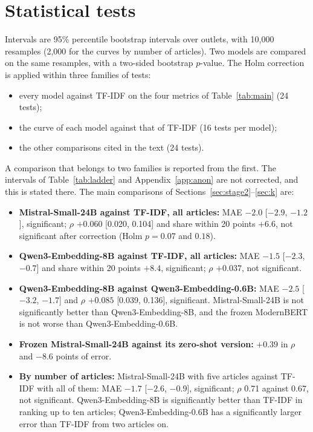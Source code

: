 \documentclass[11pt,a4paper]{article}
\begin{document}
\section{Statistical tests}\label{app:stats}
Intervals are 95\% percentile bootstrap intervals over outlets, with 10,000 resamples (2,000 for the curves by number of
articles). Two models are compared on the same resamples, with a two-sided bootstrap $p$-value. The Holm correction is
applied within three families of tests:
\begin{itemize}
  \item every model against TF-IDF on the four metrics of Table~\ref{tab:main} (24 tests);
  \item the curve of each model against that of TF-IDF (16 tests per model);
  \item the other comparisons cited in the text (24 tests).
\end{itemize}
A comparison that belongs to two families is reported from the first. The intervals of Table~\ref{tab:ladder} and
Appendix~\ref{app:anon} are not corrected, and this is stated there. The main comparisons of
Sections~\ref{sec:stage2}--\ref{sec:k} are:
\begin{itemize}
  \item \textbf{Mistral-Small-24B against TF-IDF, all articles:} MAE $-2.0$ [$-2.9$, $-1.2$], significant; $\rho$
        $+0.060$ [0.020, 0.104] and share within 20 points $+6.6$, not significant after correction (Holm $p = 0.07$ and
        $0.18$).
  \item \textbf{Qwen3-Embedding-8B against TF-IDF, all articles:} MAE $-1.5$ [$-2.3$, $-0.7$] and share within 20 points
        $+8.4$, significant; $\rho$ $+0.037$, not significant.
  \item \textbf{Qwen3-Embedding-8B against Qwen3-Embedding-0.6B:} MAE $-2.5$ [$-3.2$, $-1.7$] and $\rho$ $+0.085$ [0.039,
        0.136], significant. Mistral-Small-24B is not significantly better than Qwen3-Embedding-8B, and the frozen
        ModernBERT is not worse than Qwen3-Embedding-0.6B.
  \item \textbf{Frozen Mistral-Small-24B against its zero-shot version:} $+0.39$ in $\rho$ and $-8.6$ points of error.
  \item \textbf{By number of articles:} Mistral-Small-24B with five articles against TF-IDF with all of them: MAE $-1.7$
        [$-2.6$, $-0.9$], significant; $\rho$ 0.71 against 0.67, not significant. Qwen3-Embedding-8B is significantly
        better than TF-IDF in ranking up to ten articles; Qwen3-Embedding-0.6B has a significantly larger error than
        TF-IDF from two articles on.
\end{itemize}
\end{document}
